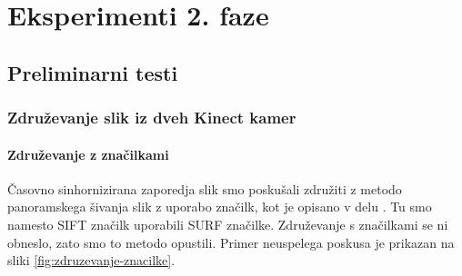 \section{Eksperimenti 2. faze}
\subsection{Preliminarni testi}
\subsubsection{Združevanje slik iz dveh Kinect kamer}\label{sec:zdruzevanje}

\paragraph{Združevanje z značilkami}
Časovno sinhornizirana zaporedja slik smo poskušali združiti z metodo panoramskega šivanja slik z uporabo značilk, kot je opisano v delu \cite{brown2007automatic}. Tu smo namesto SIFT značilk uporabili SURF značilke.
Združevanje s značilkami se ni obneslo, zato smo to metodo opustili. Primer neuspelega poskusa je prikazan na sliki \ref{fig:zdruzevanje-znacilke}.

